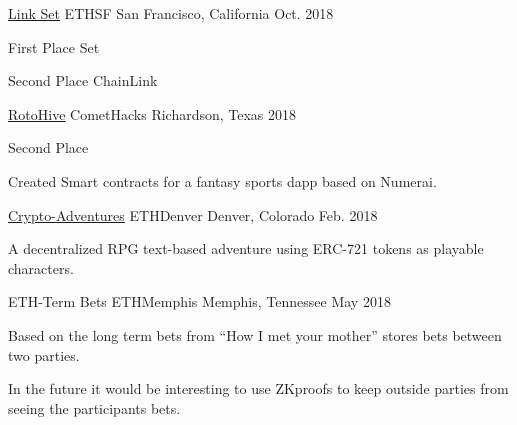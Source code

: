 

\begin{cventries}
  \cventry
    {\href{https://github.com/Emiller88/Link-Set}{Link Set}} %
    {ETHSF} %
    {San Francisco, California} %
    {Oct. 2018} %
    {
      \begin{cvitems} %
        \item {First Place Set}
        \item {Second Place ChainLink}
      \end{cvitems}
    }
  \cventry
    {\href{https://github.com/Emiller88/Rotohive}{RotoHive}} %
    {CometHacks} %
    {Richardson, Texas} %
    {2018} %
    {
      \begin{cvitems} %
        \item {Second Place}
        \item {Created Smart contracts for a fantasy sports dapp based on Numerai.}
      \end{cvitems}
    }

  \cventry
    {\href{https://github.com/Crypto-Adventures/}{Crypto-Adventures}} %
    {ETHDenver} %
    {Denver, Colorado} %
    {Feb. 2018} %
    {
      \begin{cvitems} %
        \item {A decentralized RPG text-based adventure using ERC-721 tokens as playable characters.}
      \end{cvitems}
    }

  \cventry
    {ETH-Term Bets} %
    {ETHMemphis} %
    {Memphis, Tennessee} %
    {May 2018} %
    {
      \begin{cvitems} %
        \item {Based on the long term bets from ``How I met your mother'' stores bets between two parties.}
        \item {In the future it would be interesting to use ZKproofs to keep outside parties from seeing the participants bets.}
      \end{cvitems}
    }
\end{cventries}
